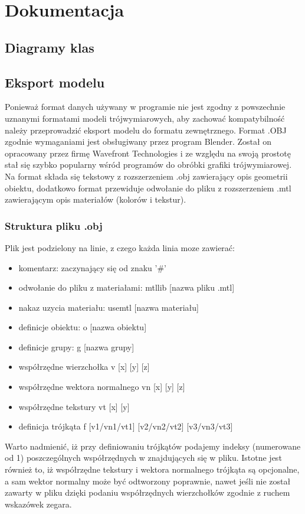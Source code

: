 \chapter{Dokumentacja}

\section{Diagramy klas}

\section{Eksport modelu}
Ponieważ format danych używany w programie nie jest zgodny z powszechnie uznanymi formatami modeli trójwymiarowych, aby zachować kompatybilność należy przeprowadzić eksport modelu do 
formatu zewnętrznego. Format .OBJ zgodnie wymaganiami jest obsługiwany przez program Blender.
Został on opracowany przez firmę Wavefront Technologies i ze względu na swoją prostotę stał się szybko
popularny wśród programów do obróbki grafiki trójwymiarowej. Na format składa się tekstowy z rozszerzeniem .obj 
zawierający opis geometrii obiektu, dodatkowo format przewiduje odwołanie do pliku z rozszerzeniem .mtl zawierającym
opis materiałów (kolorów i tekstur).
\subsection{Struktura pliku .obj}
Plik jest podzielony na linie, z czego każda linia moze zawierać:
\begin{itemize}
\item komentarz: zaczynający się od znaku '\#'
\item odwołanie do pliku z materiałami: mtllib [nazwa pliku .mtl]
\item nakaz uzycia materiału: usemtl [nazwa materiału]
\item definicje obiektu: o [nazwa obiektu]
\item definicje grupy: g [nazwa grupy]
\item współrzędne wierzchołka v [x] [y] [z]
\item współrzędne wektora normalnego vn [x] [y] [z]
\item współrzędne tekstury vt [x] [y]
\item definicja trójkąta f [v1/vn1/vt1] [v2/vn2/vt2] [v3/vn3/vt3]
\end{itemize}
Warto nadmienić, iż przy definiowaniu trójkątów podajemy indeksy (numerowane od 1) poszczególnych współrzędnych w znajdujących się w pliku.
Istotne jest również to, iż współrzędne tekstury i wektora normalnego trójkąta są opcjonalne, a sam wektor normalny może być odtworzony poprawnie,
nawet jeśli nie został zawarty w pliku dzięki podaniu współrzędnych wierzchołków zgodnie z ruchem wskazówek zegara.
